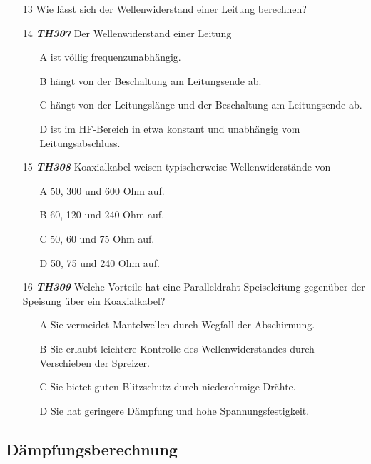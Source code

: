 \begin{enumerate} 
\itemsep1pt\parskip0pt
\item[13] Wie lässt sich der Wellenwiderstand einer Leitung berechnen?
\item[14] \emph{\textbf{TH307}}  Der Wellenwiderstand einer Leitung
	\begin{enumerate}
	\itemsep1pt\parskip0pt
		\item[A] ist völlig frequenzunabhängig.
		\item[B] hängt von der Beschaltung am Leitungsende ab.
		\item[C] hängt von der Leitungslänge und der Beschaltung am Leitungsende ab.
		\item[D] ist im HF-Bereich in etwa konstant und unabhängig vom Leitungsabschluss.
	\end{enumerate}
\item[15] \emph{\textbf{TH308}}  Koaxialkabel weisen typischerweise Wellenwiderstände von
	\begin{enumerate}
	\itemsep1pt\parskip0pt
		\item[A] 50, 300 und 600 Ohm auf.
		\item[B] 60, 120 und 240 Ohm auf.
		\item[C] 50, 60 und 75 Ohm auf.
		\item[D] 50, 75 und 240 Ohm auf.
	\end{enumerate}
\item[16] \emph{\textbf{TH309}}  Welche Vorteile hat eine Paralleldraht-Speiseleitung gegenüber der Speisung über ein Koaxialkabel?
	\begin{enumerate}
	\itemsep1pt\parskip0pt
		\item[A] Sie vermeidet Mantelwellen durch Wegfall der Abschirmung.
		\item[B] Sie erlaubt leichtere Kontrolle des Wellenwiderstandes durch Verschieben der Spreizer.
		\item[C] Sie bietet guten Blitzschutz durch niederohmige Drähte.
		\item[D] Sie hat geringere Dämpfung und hohe Spannungsfestigkeit.
	\end{enumerate}
\end{enumerate}

\subsection*{Dämpfungsberechnung}

